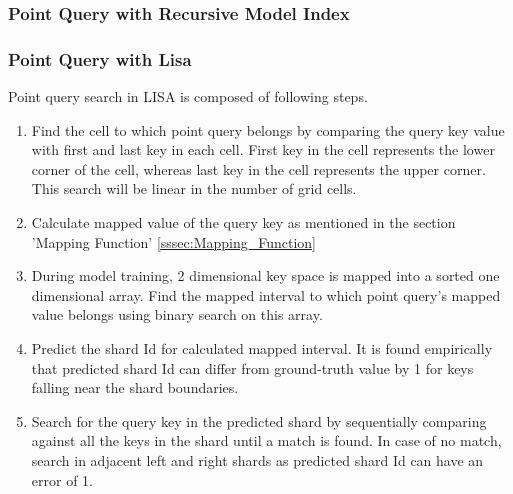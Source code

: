 

\subsubsection{Point Query with Recursive Model Index}



\subsubsection{Point Query with Lisa}
Point query search in LISA is composed of following steps.

\begin{enumerate}
	\item Find the cell to which point query belongs by comparing the query key value with first and last key in each cell. First key in the cell represents the lower corner of the cell, whereas last key in the cell represents the upper corner. This search will be linear in the number of grid cells.
	\item Calculate mapped value of the query key as mentioned in the section 'Mapping Function' \ref{sssec:Mapping_Function}
	\item During model training, 2 dimensional key space is mapped into a sorted one dimensional array. Find the mapped interval to which point query's mapped value belongs using binary search on this array.  
	\item Predict the shard Id for calculated mapped interval. It is found empirically that predicted shard Id can differ from ground-truth value by 1 for keys falling near the shard boundaries. 
	\item Search for the query key in the predicted shard by sequentially comparing against all the keys in the shard until a match is found. In case of no match, search in adjacent left and right shards as predicted shard Id can have an error of 1. 
\end{enumerate}
